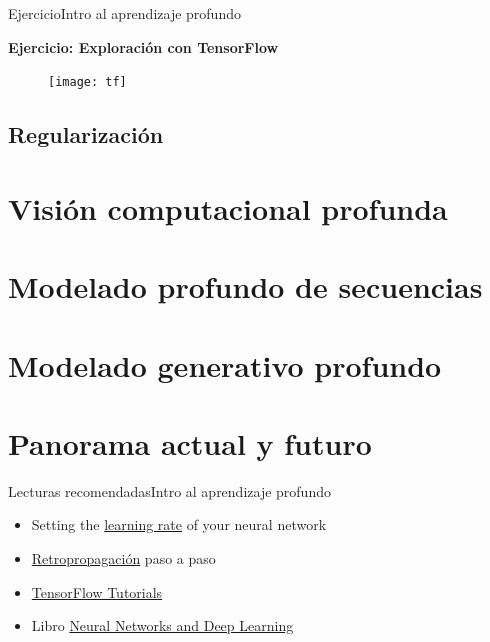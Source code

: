 \documentclass[10pt,border=3pt,tikz]{beamer}
\begin{document}
    \begin{frame}{Ejercicio}{Intro al aprendizaje profundo}
        \begin{center}
            {\Large \textbf{Ejercicio: Exploración con TensorFlow}}
        \end{center}
        \begin{figure}
            \centering
            \texttt{[image: tf]}
        \end{figure}
    \end{frame}
    
    \subsection{Regularización}
    \section{Visión computacional profunda}
    \section{Modelado profundo de secuencias}
    \section{Modelado generativo profundo}
    \section{Panorama actual y futuro}
    
    \begin{frame}{Lecturas recomendadas}{Intro al aprendizaje profundo}
        \begin{itemize}
            \item Setting the   \colorbox{blue!10}{\href{https://www.jeremyjordan.me/nn-learning-rate/}{learning rate}} of your neural network
            \item \colorbox{blue!10}{\href{https://hmkcode.com/ai/backpropagation-step-by-step/}{Retropropagación}} paso a paso
            \item \colorbox{blue!10}{\href{https://www.tensorflow.org/tutorials}{TensorFlow Tutorials}}
            \item Libro \colorbox{blue!10}{\href{http://neuralnetworksanddeeplearning.com/}{Neural Networks and Deep Learning}}
        \end{itemize}
    \end{frame}

	
\end{document}
